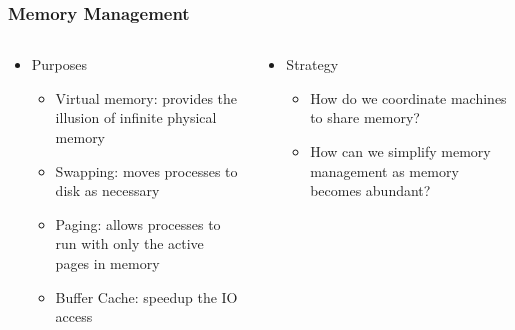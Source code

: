 \begin{frame}[t]
	\frametitle{Memory Management}
	\begin{columns}[t]
		\begin{column}{.5\textwidth}
			
			\begin{itemize}\Large
				\item Purposes
				\begin{itemize}\large
					\item Virtual memory: provides the
					illusion of infinite physical
					memory
					\item Swapping: moves processes to
					disk as necessary
					\item Paging: allows processes to run
					with only the active pages in
					memory
					\item Buffer Cache: speedup the IO
					access
					
				\end{itemize}
			\end{itemize}
			
		\end{column}
		
		\begin{column}{.5\textwidth}
			
			\begin{itemize}\Large
				\item Strategy
				\begin{itemize}\large
					\item How do we coordinate
					machines to share
					memory?
					\item How can we simplify
					memory management as
					memory becomes
					abundant?
					
				\end{itemize}
			\end{itemize}
			
		\end{column}
	\end{columns}
\end{frame}

